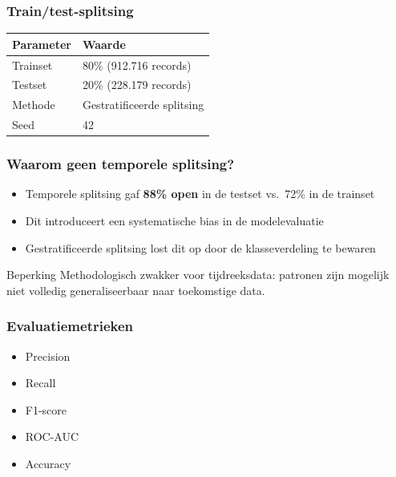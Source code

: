 \documentclass[aspectratio=169]{beamer}
\begin{document}
    \begin{frame}
        \frametitle{Train/test-splitsing}
        
        \begin{center}
            \begin{tabular}{ll}
                \toprule
                \textbf{Parameter} & \textbf{Waarde} \\
                \midrule
                Trainset & 80\% \quad (912.716 records) \\
                Testset  & 20\% \quad (228.179 records) \\
                Methode  & Gestratificeerde splitsing \\
                Seed     & 42 \\
                \bottomrule
            \end{tabular}
        \end{center}
      
    \end{frame}
    
    \begin{frame}
        \frametitle{Waarom geen temporele splitsing?}
        
        \begin{itemize}
            \item Temporele splitsing gaf \textbf{88\% open} in de testset vs.\ 72\% in de trainset
            \item Dit introduceert een systematische bias in de modelevaluatie
            \item Gestratificeerde splitsing lost dit op door de klasseverdeling te bewaren
        \end{itemize}
        
        \vspace{0.5em}
        \begin{alertblock}{Beperking}
            Methodologisch zwakker voor tijdreeksdata: patronen zijn mogelijk niet volledig generaliseerbaar naar toekomstige data.
        \end{alertblock}
        
    \end{frame}
    
    \begin{frame}
        \frametitle{Evaluatiemetrieken}
            
        \begin{itemize}
            \item Precision
            \item Recall
            \item F1-score
            \item ROC-AUC
            \item Accuracy
        \end{itemize}
        
    \end{frame}
    
\end{document}
